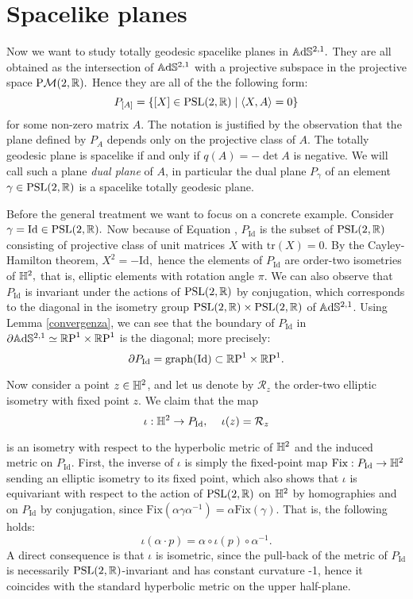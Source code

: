 \section{Spacelike planes}
Now we want to study totally geodesic spacelike planes in $\mathbb{A}\mathrm{d}\mathbb{S}^{2,1}.$ They are all obtained as the intersection of $\mathbb{A}\mathrm{d}\mathbb{S}^{2,1}$ with a projective subspace in the projective space $\text{P}\mathcal{M}(2,\mathbb{R}).$ Hence they are all of the the following form: 
\begin{equation}\label{geoplanes}
    P_{[A]}=\{[X]\in\text{PSL}(2,\mathbb{R})\;|\;\langle X,A\rangle=0\}
\end{equation}
for some non-zero matrix $A$. The notation is justified by the observation that the plane defined by $P_A$ depends only on the projective class of $A$. The totally geodesic plane is spacelike if and only if $q(A)=-\det A$ is negative. We will call such a plane \textit{dual plane} of $A$, in particular the dual plane $P_\gamma$  of an element $\gamma\in\text{PSL}(2,\mathbb{R})$ is a spacelike totally geodesic plane. \\
\begin{example}\label{spacelikeisometry}
Before the general treatment we want to focus on a concrete example. Consider $\gamma=\text{Id}\in\text{PSL}(2,\mathbb{R}).$ Now because of Equation , $P_{\text{Id}}$ is the subset of $\text{PSL}(2,\mathbb{R})$ consisting of projective class of unit matrices $X$ with $\text{tr}(X)=0$. By the Cayley-Hamilton theorem, $X^2=-\text{Id},$ hence the elements of $P_{\text{Id}}$ are order-two isometries of $\mathbb{H}^2,$ that is, elliptic elements with rotation angle $\pi$.  We can also observe that $P_{\text{Id}}$ is invariant under the actions of $\text{PSL}(2,\mathbb{R})$ by conjugation, which corresponds to the diagonal in the isometry group $\text{PSL}(2,\mathbb{R})\times\text{PSL}(2,\mathbb{R})$ of $\mathbb{A}\mathrm{d}\mathbb{S}^{2,1}$. Using Lemma \ref{convergenza}, we can see that the boundary of $P_{\text{Id}}$ in $\partial\mathbb{A}\mathrm{d}\mathbb{S}^{2,1}\simeq \mathbb{R}\text{P}^1\times\mathbb{R}\text{P}^1$ is the diagonal; more precisely: 
\begin{equation}\label{graphino}
    \partial P_{\text{Id}}=\text{graph(Id)}\subset \mathbb{R}\text{P}^1\times\mathbb{R}\text{P}^1.
\end{equation}

Now consider a point $z\in\mathbb{H}^2$, and let us denote by $\mathcal{R}_z$ the order-two elliptic isometry with fixed point $z$. We claim that the map 
\[
    \iota:\mathbb{H}^2\to P_{\text{Id}},\;\;\;\ \iota(z)=\mathcal{R}_z
\]

is an isometry with respect to the hyperbolic metric of $\mathbb{H}^2$ and the induced metric on $P_{\text{Id}}.$ First, the inverse of $\iota$ is simply the fixed-point map $\text{Fix}:P_{\text{Id}}\to\mathbb{H}^2$ sending an elliptic isometry to its fixed point, which also shows that $\iota$ is equivariant with respect to the action of $\text{PSL}(2,\mathbb{R})$ on $\mathbb{H}^2$ by homographies and on $P_\text{Id}$ by conjugation, since $\text{Fix}(\alpha\gamma\alpha^{-1})=\alpha\text{Fix}(\gamma).$ That is, the following holds: 
\begin{equation}
    \iota(\alpha\cdot p)=\alpha\circ\iota(p)\circ\alpha^{-1}.
\end{equation} 
A direct consequence is that $\iota$ is isometric, since the pull-back of the metric of $P_\text{Id}$ is necessarily $\text{PSL}(2,\mathbb{R})$-invariant and has constant curvature -1, hence it coincides with the standard hyperbolic metric on the upper half-plane.
\end{example}
